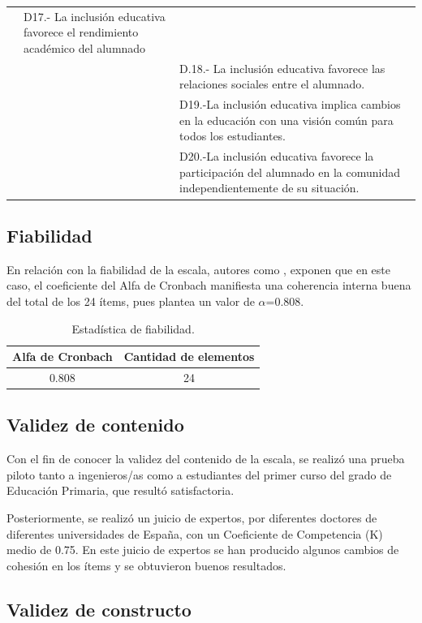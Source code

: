 \documentclass[spanish]{textolivre}
\begin{document}
\begin{table}[h!]
\begin{tabular}{p{}p{}p{}}
& D17.- La inclusión educativa favorece el rendimiento académico del alumnado \\ &
& D.18.- La inclusión educativa favorece las relaciones sociales entre el alumnado.\\ &
& D19.-La inclusión educativa implica cambios en la educación con una visión común para todos los estudiantes.\\ & 
& D20.-La inclusión educativa favorece la participación del alumnado en la comunidad independientemente de su situación.\\
\hline
\end{tabular}
\end{table}

\subsection{Fiabilidad}

En relación con la fiabilidad de la escala, autores como \textcite{george_spss_2003}, exponen que en este caso, el coeficiente del Alfa de Cronbach manifiesta una coherencia interna buena del total de los 24 ítems, pues plantea un valor de $\alpha$=0.808.

\begin{table}[h!]
\centering
\caption{Estadística de fiabilidad.}
\begin{tabular}{c|c}
\toprule
Alfa de Cronbach & Cantidad de elementos \\
\hline
0.808 & 24 \\
\hline
\end{tabular}
\label{Tabla02}
\end{table}

\subsection{Validez de contenido}

Con el fin de conocer la validez del contenido de la escala, se realizó una prueba piloto tanto a ingenieros/as como a estudiantes del primer curso del grado de Educación Primaria, que resultó satisfactoria.

Posteriormente, se realizó un juicio de expertos, por diferentes doctores de diferentes universidades de España, con un Coeficiente de Competencia (K) medio de 0.75. En este juicio de expertos se han producido algunos cambios de cohesión en los ítems y se obtuvieron buenos resultados.

\subsection{Validez de constructo}
\end{document}
